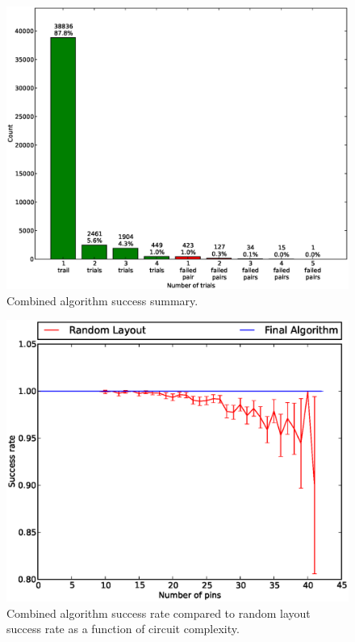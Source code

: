 \begin{figure}[H]
\begin{center}
\includegraphics[width=\textwidth]{Images/final_algorithm_num_trials.eps}
\caption[Combined algorithm success summary]{Combined algorithm success summary.}
\label{fig:final_num_trials}
\end{center}
\end{figure}

\begin{figure}[H]
\begin{center}
\includegraphics[width=\textwidth]{Images/final_algorithm_success_rate_trend.eps}
\caption[Combined algorithm success trend]{Combined algorithm success rate
compared to random layout success rate as a function of circuit complexity.}
\label{fig:final_success}
\end{center}
\end{figure}

